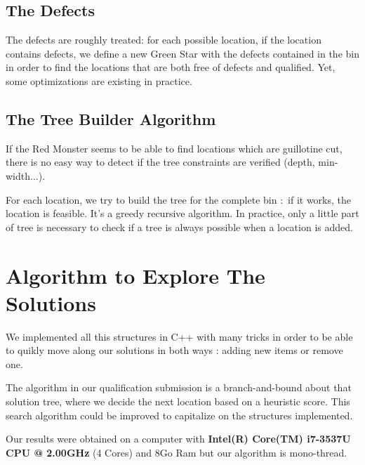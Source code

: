 \documentclass{article}
\begin{document}
        \subsection{The Defects}
    The defects are roughly treated: for each possible location, if the location contains defects, we define a new Green Star with the defects contained in the bin in order to find the locations that are both free of defects and qualified. Yet, some optimizations are existing in practice.

        \subsection{The Tree Builder Algorithm}
    If the Red Monster seems to be able to find locations which are guillotine cut, there is no easy way to detect if the tree constraints are verified (depth, min-width...). 

    For each location, we try to build the tree for the complete bin : if it works, the location is feasible. It's a greedy recursive algorithm. In practice, only a little part of tree is necessary to check if a tree is always possible when a location is added.

    \section{Algorithm to Explore The Solutions}
        We implemented all this structures in C++ with many tricks in order to be able to quikly move along our solutions in both ways : adding new items or remove one. 

        The algorithm in our qualification submission is a branch-and-bound about that solution tree, where we decide the next location based on a heuristic score. This search algorithm could be improved to capitalize on the structures implemented. 

        
        Our results were obtained on a computer with \textbf{Intel(R) Core(TM) i7-3537U CPU @ 2.00GHz} (4 Cores) and 8Go Ram but our algorithm is mono-thread.

        
    
\end{document}
